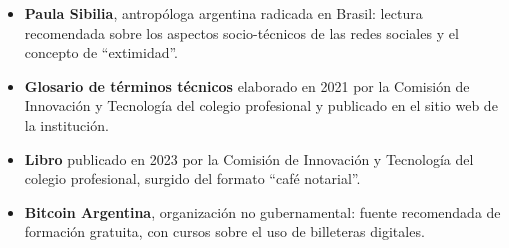 \documentclass[12pt,oneside]{book}
\begin{document}
\begin{itemize}
    \item \textbf{Paula Sibilia}, antropóloga argentina radicada en Brasil: lectura recomendada sobre los aspectos socio-técnicos de las redes sociales y el concepto de ``extimidad''.
    \item \textbf{Glosario de términos técnicos} elaborado en 2021 por la Comisión de Innovación y Tecnología del colegio profesional y publicado en el sitio web de la institución.
    \item \textbf{Libro} publicado en 2023 por la Comisión de Innovación y Tecnología del colegio profesional, surgido del formato ``café notarial''.
    \item \textbf{Bitcoin Argentina}, organización no gubernamental: fuente recomendada de formación gratuita, con cursos sobre el uso de billeteras digitales.
\end{itemize}
\end{document}
